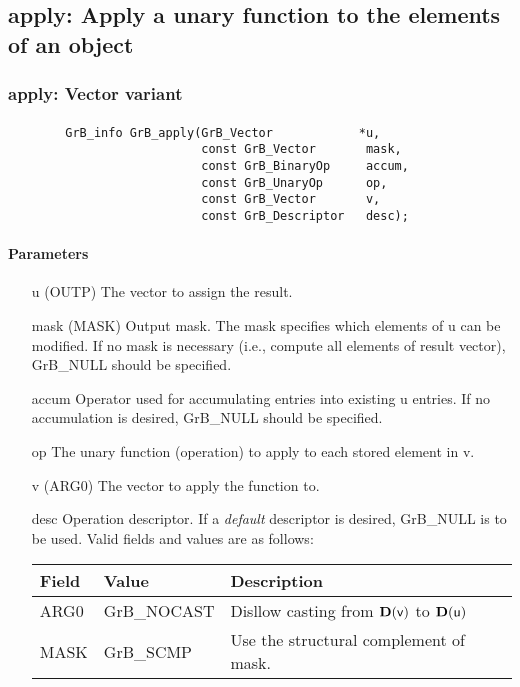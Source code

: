 \subsection{{\sf apply}: Apply a unary function to the elements of an object}


\subsubsection{{\sf apply}: Vector variant}
\paragraph{\syntax}

\begin{verbatim}
        GrB_info GrB_apply(GrB_Vector            *u,
                           const GrB_Vector       mask,
                           const GrB_BinaryOp     accum,
                           const GrB_UnaryOp      op,
                           const GrB_Vector       v,
                           const GrB_Descriptor   desc);
\end{verbatim}

\paragraph{Parameters}

\begin{itemize}[leftmargin=1.1in]
    \item[{\sf u}]   ({\sf OUTP}) The vector to assign the result.

    \item[{\sf mask}] ({\sf MASK}) Output mask. The mask
    specifies which elements of {\sf u} can be modified.
    If no mask is necessary (i.e., compute all elements of result
    vector), {\sf GrB\_NULL} should be specified.

    \item[{\sf accum}]  Operator used for accumulating entries into existing {\sf u} entries. 
			If no accumulation is desired, {\sf GrB\_NULL} should be specified.

    \item[{\sf op}]    The unary function (operation) to apply to each stored element in {\sf v}.
    \item[{\sf v}]   ({\sf ARG0}) The vector to apply the function to.
    \item[{\sf desc}]   Operation descriptor. If a
    \emph{default} descriptor is desired, {\sf GrB\_NULL} is to be
    used.  Valid fields and values are as follows: \\
    \begin{tabular}{lll}
    Field  & Value & Description \\
    \hline
    {\sf ARG0} & {\sf GrB\_NOCAST} & Disllow casting from $\bold{D}({\sf v})$ to $\bold{D}({\sf u})$ \\
    {\sf MASK} & {\sf GrB\_SCMP} & Use the structural complement of {\sf mask}. \\
    \end{tabular}
\end{itemize}

